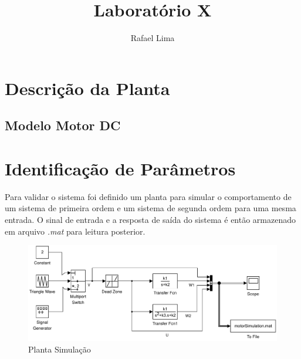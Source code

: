 \documentclass[a4paper,11pt]{article}
\title{Laboratório X} %
\author{Rafael Lima}
\begin{document}


\section{Descrição da Planta}

\subsection{Modelo Motor DC}



\section{Identificação de Parâmetros}


Para validar o sistema foi definido um planta para simular o comportamento de um sistema de primeira ordem e um sistema de segunda ordem para uma mesma entrada. O sinal de entrada e a resposta de saída do sistema é então armazenado em arquivo \textit{.mat} para leitura posterior.

\begin{figure}[H]
    \centering
    \includegraphics[width=1.0\linewidth]{tex/img/dcMotorSimulation.pdf}
    \caption{Planta Simulação}
    \label{fig:my_label}
\end{figure}
\end{document}

